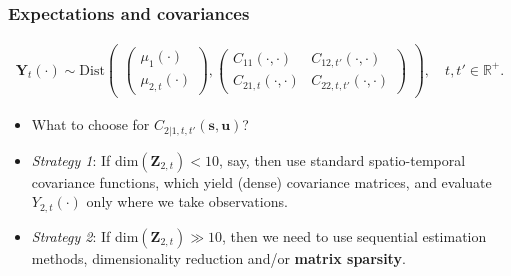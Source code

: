 \documentclass{beamer}
\newcommand{\svec} {\textbf{s}}
\newcommand{\uvec} {\textbf{u}}
\newcommand{\Yvec}{\mathbf{Y}}
\newcommand{\Zvec}{\mathbf{Z}}
\newcommand{\bSigma}{\bm{\Sigma}}
\newcommand{\Dist}{\mathrm{Dist}}
\begin{document}
\begin{frame}
\frametitle{Expectations and covariances}

\begin{align*}
\Yvec_t(\cdot) \sim \Dist\begin{pmatrix} \begin{pmatrix} \mu_1(\cdot) \\ \mu_{2,t}(\cdot) \end{pmatrix},\begin{pmatrix}  C_{11}(\cdot,\cdot) &  C_{12,t'}(\cdot,\cdot) \\  C_{21,t}(\cdot,\cdot) &  C_{22,t,t'}(\cdot,\cdot) \end{pmatrix} \end{pmatrix},\quad t,t' \in \mathbb{R}^+.
\end{align*}

\begin{itemize}
\item What to choose for $C_{2|1,t,t'}(\svec,\uvec)$? \vfill
\item \emph{Strategy 1}: If dim$(\Zvec_{2,t}) < 10$, say, then use standard spatio-temporal covariance functions, which yield (dense) covariance matrices, and evaluate $Y_{2,t}(\cdot)$ only where we take observations. \vfill
\item \emph{Strategy 2}: If dim$(\Zvec_{2,t}) \gg 10$, then we need to use sequential estimation methods,  dimensionality reduction and/or {\bf matrix sparsity}. \vfill
\end{itemize}
\end{frame}
\end{document}
